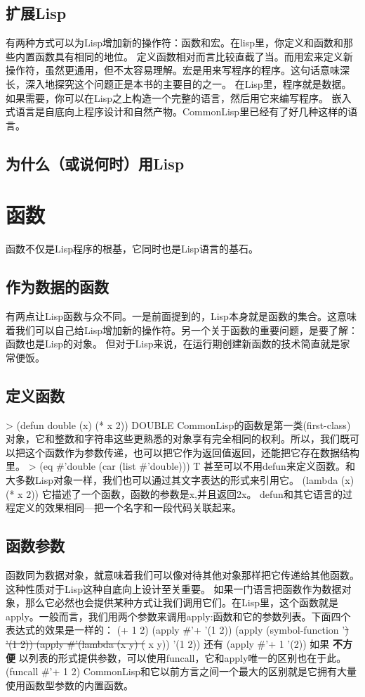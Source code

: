 \documentclass{ctexart}
\begin{document}
\subsection{扩展Lisp}
\label{sec-1-4}
有两种方式可以为Lisp增加新的操作符：函数和宏。在lisp里，你定义和函数和那些内置函数具有相同的地位。
定义函数相对而言比较直截了当。而用宏来定义新操作符，虽然更通用，但不太容易理解。宏是用来写程序的程序。这句话意味深长，深入地探究这个问题正是本书的主要目的之一。
在Lisp里，程序就是数据。
如果需要，你可以在Lisp之上构造一个完整的语言，然后用它来编写程序。
嵌入式语言是自底向上程序设计和自然产物。CommonLisp里已经有了好几种这样的语言。
\subsection{为什么（或说何时）用Lisp}
\label{sec-1-5}
\section{函数}
\label{sec-2}
函数不仅是Lisp程序的根基，它同时也是Lisp语言的基石。
\subsection{作为数据的函数}
\label{sec-2-1}
有两点让Lisp函数与众不同。一是前面提到的，Lisp本身就是函数的集合。这意味着我们可以自己给Lisp增加新的操作符。另一个关于函数的重要问题，是要了解：函数也是Lisp的对象。
但对于Lisp来说，在运行期创建新函数的技术简直就是家常便饭。
\subsection{定义函数}
\label{sec-2-2}
> (defun double (x) (* x 2))
DOUBLE
CommonLisp的函数是第一类(first-class)对象，它和整数和字符串这些更熟悉的对象享有完全相同的权利。所以，我们既可以把这个函数作为参数传递，也可以把它作为返回值返回，还能把它存在数据结构里。
> (eq \#'double (car (list \#'double)))
T
甚至可以不用defun来定义函数。和大多数Lisp对象一样，我们也可以通过其文字表达的形式来引用它。
(lambda (x) (* x 2))
它描述了一个函数，函数的参数是x,并且返回2x。
defun和其它语言的过程定义的效果相同---把一个名字和一段代码关联起来。
\subsection{函数参数}
\label{sec-2-3}
函数同为数据对象，就意味着我们可以像对待其他对象那样把它传递给其他函数。这种性质对于Lisp这种自底向上设计至关重要。
如果一门语言把函数作为数据对象，那么它必然也会提供某种方式让我们调用它们。在Lisp里，这个函数就是apply。一般而言，我们用两个参数来调用apply:函数和它的参数列表。下面四个表达式的效果是一样的：
(+ 1 2)
(apply \#'+ '(1 2))
(apply (symbol-function '\sout{) '(1 2))
(apply \#'(lambda (x y) (} x y)) '(1 2))
还有
(apply \#'+ 1 '(2))
如果 \textbf{不方便} 以列表的形式提供参数，可以使用funcall，它和apply唯一的区别也在于此。
(funcall \#'+ 1 2)
CommonLisp和它以前方言之间一个最大的区别就是它拥有大量使用函数型参数的内置函数。
\end{document}
